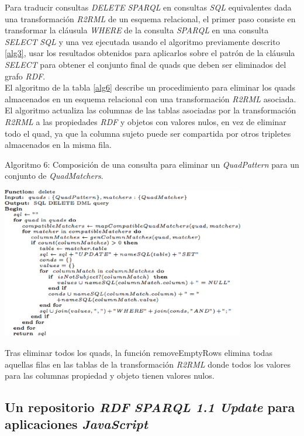 Para traducir consultas \textit{DELETE} \textit{SPARQL} en consultas \textit{SQL} equivalentes dada una transformaci\'on \textit{R2RML} de un esquema relacional, el primer paso consiste en transformar la cl\'ausula \textit{WHERE} de la consulta \textit{SPARQL} en una consulta \textit{SELECT} \textit{SQL} y una vez ejecutada usando el algoritmo previamente descrito \ref{alg3}, usar los resultados obtenidos para aplicarlos sobre el patr\'on de la cl\'ausula \textit{SELECT} para obtener el conjunto final de quads que deben ser eliminados del grafo \textit{RDF}.\\
El algoritmo de la tabla \ref{alg6} describe un procedimiento para eliminar los quads almacenados en un esquema relacional con una transformaci\'on \textit{R2RML} asociada. El algoritmo actualiza las columnas de las tablas asociadas por la transformaci\'on \textit{R2RML} a las propiedades \textit{RDF} y objetos con valores nulos, en vez de eliminar todo el quad, ya que la columna sujeto puede ser compartida por otros tripletes almacenados en la misma fila.\\

\begin{table}
\vspace{2.4in}
\caption{Algoritmo 6: Composici\'on de una consulta para eliminar un \textit{QuadPattern} para un conjunto de \textit{QuadMatchers}.}
\vspace{5mm}
\includegraphics[width=0.8\textwidth]{algoritmo6}
\label{alg6}
\end{table}


Tras eliminar todos los quads, la funci\'on removeEmptyRows elimina todas aquellas filas en las tablas de la transformaci\'on \textit{R2RML} donde todos los valores para las columnas propiedad y objeto tienen valores nulos.

\subsection{Un repositorio \textit{RDF} \textit{SPARQL 1.1 Update} para aplicaciones \textit{JavaScript}}
\label{sec_rdfstorejs}

